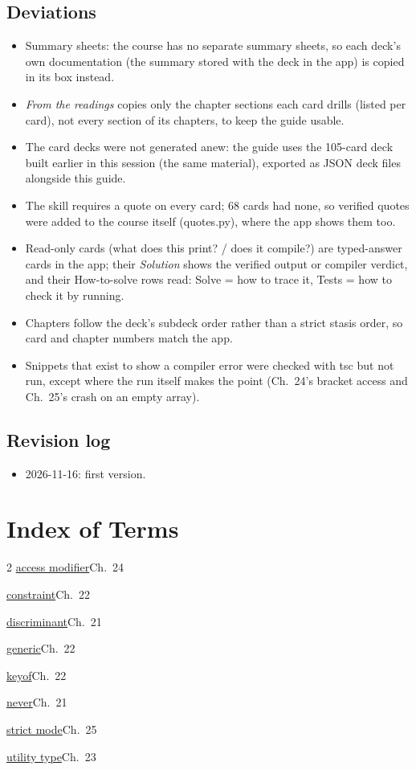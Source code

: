 \documentclass[10pt]{article}
\newcommand{\code}[1]{{\ttfamily\small #1}}
\newcommand{\ix}[3]{\hyperlink{t:#1}{#2}\dotfill #3\par}
\begin{document}
\subsection*{Deviations}
{\footnotesize\begin{itemize}
\item Summary sheets: the course has no separate summary sheets, so each deck's own documentation (the summary stored with the deck in the app) is copied in its box instead.
\item \emph{From the readings} copies only the chapter sections each card drills (listed per card), not every section of its chapters, to keep the guide usable.
\item The card decks were not generated anew: the guide uses the 105-card deck built earlier in this session (the same material), exported as JSON deck files alongside this guide.
\item The skill requires a quote on every card; 68 cards had none, so verified quotes were added to the course itself (\code{quotes.py}), where the app shows them too.
\item Read-only cards (what does this print? / does it compile?) are typed-answer cards in the app; their \emph{Solution} shows the verified output or compiler verdict, and their How-to-solve rows read: Solve = how to trace it, Tests = how to check it by running.
\item Chapters follow the deck's subdeck order rather than a strict stasis order, so card and chapter numbers match the app.
\item Snippets that exist to show a compiler error were checked with tsc but not run, except where the run itself makes the point (Ch.~24's bracket access and Ch.~25's crash on an empty array).
\end{itemize}}
\subsection*{Revision log}
{\footnotesize\begin{itemize}
\item 2026-11-16: first version.
\end{itemize}}
\section*{Index of Terms}
{\small\begin{multicols}{2}
\ix{modifier}{access modifier}{Ch.~24}
\ix{constraint}{constraint}{Ch.~22}
\ix{discriminant}{discriminant}{Ch.~21}
\ix{generic}{generic}{Ch.~22}
\ix{keyof}{keyof}{Ch.~22}
\ix{never}{never}{Ch.~21}
\ix{strict}{strict mode}{Ch.~25}
\ix{utility}{utility type}{Ch.~23}
\end{multicols}}
\end{document}
